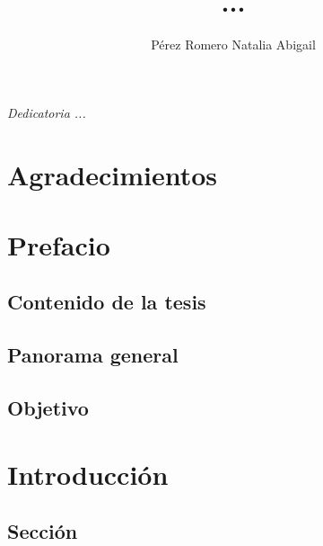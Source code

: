 \documentclass[letterpaper,12pt,oneside]{book}
\author{Pérez Romero Natalia Abigail}
\title{ ...}
\begin{document}
\frontmatter
\maketitle

\chapter*{}
\begin{flushright}%
  \emph{Dedicatoria ...}
  \thispagestyle{empty}
\end{flushright}

\chapter{Agradecimientos}

\tableofcontents

\chapter{Prefacio}

\section*{Contenido de la tesis}
\section*{Panorama general}
\section*{Objetivo}
    
\mainmatter

\chapter{Introducción} %



  

\section{Sección}
    
\end{document}
